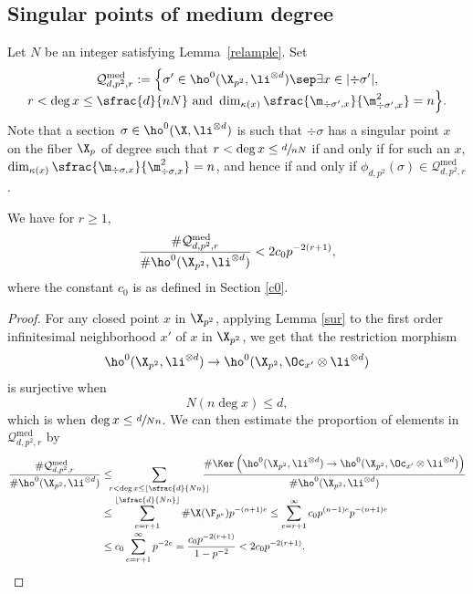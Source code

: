 \subsection{Singular points of medium degree}\label{step2}

Let $N$ be an integer satisfying Lem\-ma~\ref{relample}. Set\vspace*{-3pt}
\begin{multline*}
\mathcal{Q}^{\mathrm{med}}_{d,p^2,r}:=\Bigl\{ \sigma'\in \ho^0(\X_{p^2}, \li^{\otimes d})\sep \exists x\in |{\div\sigma'}|,\\[-5pt]
r<\deg x\leq \sfrac{d}{nN} \text{ and } \dim_{\kappa(x)}\sfrac{\m_{\div \sigma',x}}{\m^2_{\div \sigma', x}}=n \Bigr\}.
\end{multline*}
Note that a section $\sigma\in \ho^0(\X, \li^{\otimes d})$ is such that $\div \sigma$ has a singular point $x$ on the fiber $\X_p$ of degree such that $r<\deg x\leq \sfrac{d}{nN}$ if and only if for such an $x$, $\dim_{\kappa(x)}\sfrac{\m_{\div \sigma,x}}{\m^2_{\div \sigma, x}}=n$, and hence if and only if $\phi_{d,p^2}(\sigma)\in \mathcal{Q}^{\mathrm{med}}_{d,p^2,r}$.

\begin{lem}\label{medi}
We have for $r\geq 1$,\vspace*{-3pt}
\[
\frac{\#\mathcal{Q}^{\mathrm{med}}_{d,p^2,r}}{\#\ho^0(\X_{p^2}, \li^{\otimes d})}<2c_0p^{-2(r+1)},
\]
where the constant $c_0$ is as defined in Section \ref{c0}.
\end{lem}
\begin{proof}
For any closed point $x$ in $\X_{p^2}$, applying Lemma \ref{sur} to the first order infinitesimal neighborhood $x'$ of $x$ in $\X_{p^2}$, we get that the restriction morphism\vspace*{-2pt}
\[
\ho^0(\X_{p^2}, \li^{\otimes d})\to \ho^0(\X_{p^2}, \Oc_{x'}\otimes \li^{\otimes d})
\]
is surjective when\vspace*{-3pt}
\[
N(n\deg x)\leq d,
\]
which is when $\deg x\leq \sfrac{d}{Nn}$.
We can then estimate the proportion of elements in $\mathcal{Q}^{\mathrm{med}}_{d,p^2,r}$ by\vspace*{-3pt}
\begin{align*}
\frac{\#\mathcal{Q}^{\mathrm{med}}_{d,p^2,r}}{\#\ho^0(\X_{p^2}, \li^{\otimes d})}&\leq \hspace*{-2mm}\sum_{r<\deg x\leq \lfloor\sfrac{d}{Nn}\rfloor} \hspace*{-3mm}\frac{\#\Ker\left(\ho^0(\X_{p^2}, \li^{\otimes d})\to \ho^0(\X_{p^2}, \Oc_{x'}\otimes \li^{\otimes d}) \right) }{\#\ho^0(\X_{p^2}, \li^{\otimes d})}\\[-2pt]
&\leq \sum_{e=r+1}^{\lfloor\sfrac{d}{Nn}\rfloor}\#\X(\F_{p^e}) p^{-(n+1)e}\leq \sum_{e=r+1}^{\infty}c_0p^{(n-1)e} p^{-(n+1)e} \\[-2pt]
&\leq c_0 \sum_{e=r+1}^{\infty}p^{-2e}=\frac{c_0p^{-2(r+1)}}{1-p^{-2}}<2c_0p^{-2(r+1)}.\qedhere
\end{align*}
\end{proof}

